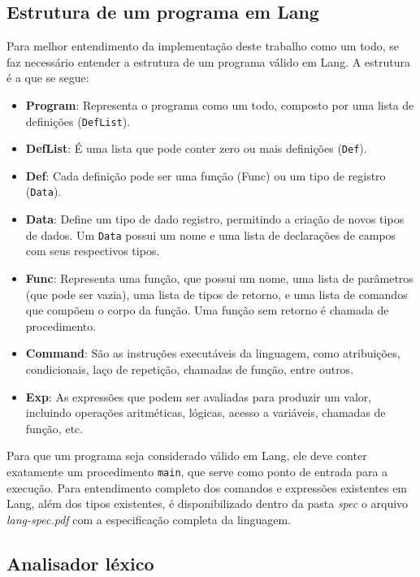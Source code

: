 \documentclass{article}
\begin{document}
\subsection{Estrutura de um programa em Lang}\label{desenvolvimento:estrutura-lang}

Para melhor entendimento da implementação deste trabalho como um todo, se faz necessário entender a estrutura de um programa válido em Lang. A estrutura é a que se segue:

\begin{itemize}
    \item \textbf{Program}: Representa o programa como um todo, composto por uma lista de definições (\texttt{DefList}).
    \item \textbf{DefList}: É uma lista que pode conter zero ou mais definições (\texttt{Def}).
    \item \textbf{Def}: Cada definição pode ser uma função (Func) ou um tipo de registro (\texttt{Data}).
    \item \textbf{Data}: Define um tipo de dado registro, permitindo a criação de novos tipos de dados. Um \texttt{Data} possui um nome e uma lista de declarações de campos com seus respectivos tipos.
    \item \textbf{Func}: Representa uma função, que possui um nome, uma lista de parâmetros (que pode ser vazia), uma lista de tipos de retorno, e uma lista de comandos que compõem o corpo da função. Uma função sem retorno é chamada de procedimento.
    \item \textbf{Command}: São as instruções executáveis da linguagem, como atribuições, condicionais, laço de repetição, chamadas de função, entre outros.
    \item \textbf{Exp}: As expressões que podem ser avaliadas para produzir um valor, incluindo operações aritméticas, lógicas, acesso a variáveis, chamadas de função, etc.
\end{itemize}

Para que um programa seja considerado válido em Lang, ele deve conter exatamente um procedimento \texttt{main}, que serve como ponto de entrada para a execução. Para entendimento completo dos comandos e expressões existentes em Lang, além dos tipos existentes, é disponibilizado dentro da pasta \textit{spec} o arquivo \textit{lang-spec.pdf} com a especificação completa da linguagem.

\subsection{Analisador léxico}\label{desenvolvimento:lexer}
\end{document}
